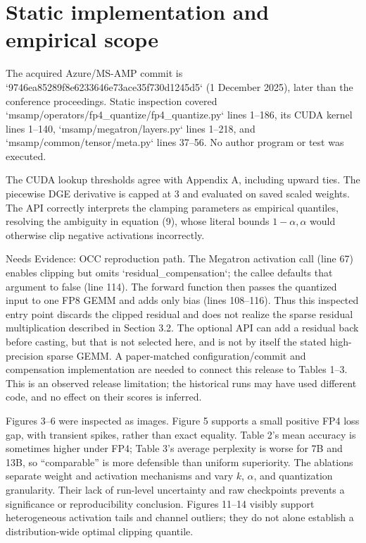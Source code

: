 \documentclass[10pt]{article}
\begin{document}
\section*{Static implementation and empirical scope}
The acquired Azure/MS-AMP commit is `9746ea85289f8e6233646e73ace35f730d1245d5` (1 December 2025), later than the conference proceedings. Static inspection covered `msamp/operators/fp4\_quantize/fp4\_quantize.py` lines 1–186, its CUDA kernel lines 1–140, `msamp/megatron/layers.py` lines 1–218, and `msamp/common/tensor/meta.py` lines 37–56. No author program or test was executed.\par
The CUDA lookup thresholds agree with Appendix A, including upward ties. The piecewise DGE derivative is capped at 3 and evaluated on saved scaled weights. The API correctly interprets the clamping parameters as empirical quantiles, resolving the ambiguity in equation (9), whose literal bounds \(1-\alpha,\alpha\) would otherwise clip negative activations incorrectly.\par
Needs Evidence: OCC reproduction path. The Megatron activation call (line 67) enables clipping but omits `residual\_compensation`; the callee defaults that argument to false (line 114). The forward function then passes the quantized input to one FP8 GEMM and adds only bias (lines 108–116). Thus this inspected entry point discards the clipped residual and does not realize the sparse residual multiplication described in Section 3.2. The optional API can add a residual back before casting, but that is not selected here, and is not by itself the stated high-precision sparse GEMM. A paper-matched configuration/commit and compensation implementation are needed to connect this release to Tables 1–3. This is an observed release limitation; the historical runs may have used different code, and no effect on their scores is inferred.\par
Figures 3–6 were inspected as images. Figure 5 supports a small positive FP4 loss gap, with transient spikes, rather than exact equality. Table 2’s mean accuracy is sometimes higher under FP4; Table 3’s average perplexity is worse for 7B and 13B, so “comparable” is more defensible than uniform superiority. The ablations separate weight and activation mechanisms and vary \(k\), \(\alpha\), and quantization granularity. Their lack of run-level uncertainty and raw checkpoints prevents a significance or reproducibility conclusion. Figures 11–14 visibly support heterogeneous activation tails and channel outliers; they do not alone establish a distribution-wide optimal clipping quantile.\par
\end{document}
